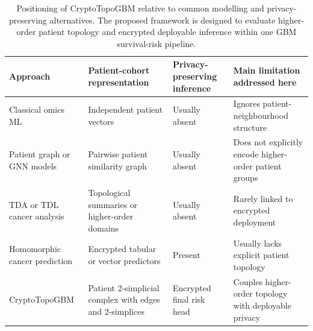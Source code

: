 \begin{table}[t]
\centering
\caption{Positioning of CryptoTopoGBM relative to common modelling and privacy-preserving alternatives. The proposed framework is designed to evaluate higher-order patient topology and encrypted deployable inference within one GBM survival-risk pipeline.}
\label{tab:novelty}
\small
\begin{tabular}{p{}p{}p{}p{}}
\toprule
Approach & Patient-cohort representation & Privacy-preserving inference & Main limitation addressed here \\
\midrule
Classical omics ML & Independent patient vectors & Usually absent & Ignores patient-neighbourhood structure \\
Patient graph or GNN models & Pairwise patient similarity graph & Usually absent & Does not explicitly encode higher-order patient groups \\
TDA or TDL cancer analysis & Topological summaries or higher-order domains & Usually absent & Rarely linked to encrypted deployment \\
Homomorphic cancer prediction & Encrypted tabular or vector predictors & Present & Usually lacks explicit patient topology \\
CryptoTopoGBM & Patient 2-simplicial complex with edges and 2-simplices & Encrypted final risk head & Couples higher-order topology with deployable privacy \\
\bottomrule
\end{tabular}
\end{table}
